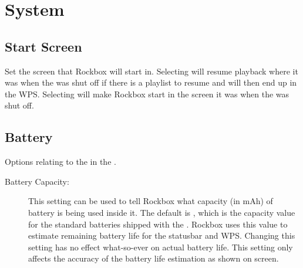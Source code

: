 \section{\label{ref:SystemOptions}System}
\subsection{Start Screen}
    Set the screen that Rockbox will start in. Selecting
     will resume playback where it was when the \dap{}
    was shut off if there is a playlist to resume and will then end up in the
    WPS. Selecting  will make Rockbox start in the
    screen it was when the \dap{} was shut off.

\subsection{Battery}
    Options relating to the %
    in the \dap.
  \begin{description}
    \item [Battery Capacity: ]This setting can be used to tell Rockbox what
      capacity (in mAh) of battery is being used inside it. The default is
      , which is the capacity value for the standard batteries shipped with the
      \dap. Rockbox uses this value to estimate remaining battery life for the 
      statusbar and WPS. Changing this setting has no effect what-so-ever on 
      actual battery life. This setting only affects the accuracy of the 
      battery life estimation as shown on screen.
   
    
  \end{description}

